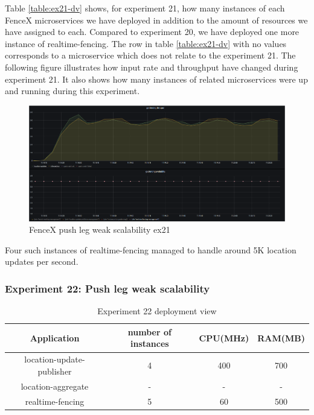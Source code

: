 \documentclass[a4]{report}
\begin{document}
    Table \ref{table:ex21-dv} shows, for experiment 21, how many instances of each FenceX microservices we have
    deployed in addition to the amount of resources we have assigned to each.
    Compared to experiment 20, we have deployed one more instance of realtime-fencing.
    The row in table \ref{table:ex21-dv} with no values corresponds to a microservice which does not relate to the
    experiment 21.
    The following figure illustrates how input rate and throughput have changed during experiment 21.
    It also shows how many instances of related microservices were up and running during this experiment.

    \begin{figure}
        \caption{FenceX push leg weak scalability ex21}
        \label{fig:ex21}
        \includegraphics[scale=0.5]{images/evaluation/ex21-benchmarking-ongoing-1per6sec.png}
    \end{figure}
    Four such instances of realtime-fencing managed to handle around 5K location updates per second.

    \clearpage

    \subsubsection{Experiment 22: Push leg weak scalability}
    \begin{table}[h!]
        \centering
        \begin{tabular}{|c|c|c|c|}
            \hline
            Application               & number of instances & CPU(MHz) & RAM(MB) \\
            \hline
            location-update-publisher & 4                   & 400      & 700     \\
            location-aggregate        & -                   & -        & -       \\
            realtime-fencing          & 5                   & 60       & 500     \\
            \hline
        \end{tabular}
        \caption{Experiment 22 deployment view}
        \label{table:ex22-dv}
    \end{table}
\end{document}
